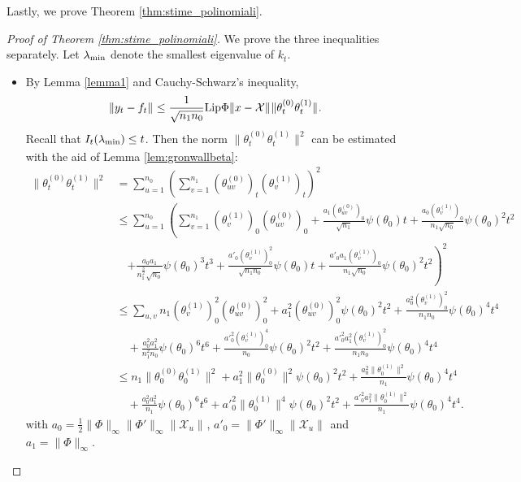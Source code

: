 \documentclass{article}
\theoremstyle{definition}
\theoremstyle{remark}
\numberwithin{equation}{section}
\newcommand{\X}{\mathcal{X}}
\newcommand{\s}{\psi}
\newcommand{\lammin}{\lambda_{\textup{min}}}
\newcommand{\norm}[2]{
    \|#1\|_{#2}
}
\begin{document}
Lastly, we prove Theorem \ref{thm:stime_polinomiali}.
\begin{proof}[Proof of Theorem \ref{thm:stime_polinomiali}]
    We prove the three inequalities separately.
    Let $\lammin$ denote the smallest eigenvalue of $k_t$.
    \begin{itemize}
        \item By Lemma \ref{lemma1} and Cauchy-Schwarz's inequality,
        \begin{align}
            \label{eqaux_3triangle}
            \norm{y_t- f_t}{} &\le \frac{1}{\sqrt{n_1n_0}} \textup{Lip}\Phi \norm{x-\X}{} \norm{\theta_t^{(0)} \theta_t^{(1)} }{}.
        \end{align}
        Recall that $I_t(\lammin) \le t$.
        Then the norm $\norm{\theta_t^{(0)} \theta_t^{(1)} }{}^2$ can be estimated with the aid of Lemma \ref{lem:gronwallbeta}:
        \begin{align}
            \norm{\theta_t^{(0)} \theta_t^{(1)}}{}^2 &= \sum_{u=1}^{n_0}\left(\sum_{v=1}^{n_1}(\theta^{(0)}_{uv})_t(\theta^{(1)}_v)_t\right)^2 \\
            &\le \sum_{u=1}^{n_0}\left(\sum_{v=1}^{n_1}(\theta_v^{(1)})_0(\theta_{uv}^{(0)})_0 + \frac{a_1(\theta_{uv}^{(0)})_0}{\sqrt{n_1}}\s(\theta_0)t + \frac{a_0(\theta_v^{(1)})_0}{n_1\sqrt{n_0}}\s(\theta_0)^2t^2 \right. \\
            &\quad \left. + \frac{a_0a_1}{n_1^\frac{3}{2}\sqrt{n_0}}\s(\theta_0)^3t^3 + \frac{a'_0(\theta_v^{(1)})^2_0}{\sqrt{n_1n_0}}\s(\theta_0)t + \frac{a'_0a_1(\theta^{(1)}_v)_0}{n_1\sqrt{n_0}}\s(\theta_0)^2t^2\right)^2\\
            &\le \sum_{u,v} n_1(\theta_v^{(1)})_0^2(\theta_{uv}^{(0)})_0^2 +a_1^2(\theta_{uv}^{(0)})^2_0\s(\theta_0)^2t^2 + \frac{a_0^2(\theta_v^{(1)})^2_0}{n_1n_0}\s(\theta_0)^4t^4 \\
            &\quad + \frac{a_0^2a_1^2}{n_1^2n_0}\s(\theta_0)^6t^6 + \frac{{a'}^2_0(\theta_v^{(1)})^4_0}{n_0}\s(\theta_0)^2t^2 + \frac{{a'}^2_0a_1^2(\theta^{(1)}_v)^2_0}{n_1n_0}\s(\theta_0)^4t^4 \\
            &\le n_1\norm{\theta^{(0)}_0\theta^{(1)}_0}{}^2 +a_1^2\norm{\theta^{(0)}_0}{}^2\s(\theta_0)^2t^2 + \frac{a_0^2\norm{\theta^{(1)}_0}{}^2}{n_1}\s(\theta_0)^4t^4 \\
            &\quad + \frac{a_0^2a_1^2}{n_1}\s(\theta_0)^6t^6 + {a'}^2_0\norm{\theta^{(1)}_0}{}^4\s(\theta_0)^2t^2 + \frac{{a'}^2_0a_1^2\norm{\theta^{(1)}_0}{}^2}{n_1}\s(\theta_0)^4t^4.
        \end{align}
        with $a_0 = \frac{1}{2}\norm{\Phi}{\infty}\norm{\Phi'}{\infty}\norm{\X_u}{}$, $a'_0 = \norm{\Phi'}{\infty}\norm{\X_u}{}$ and $a_1 = \norm{\Phi}{\infty}$.


\end{itemize}
\end{proof}
\end{document}
